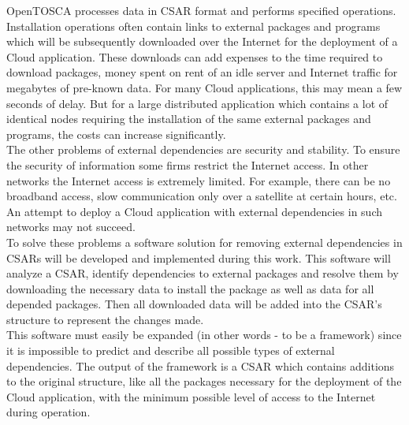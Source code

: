 OpenTOSCA processes data in CSAR format and performs specified operations. %
Installation operations often contain links to external packages and programs which will be subsequently downloaded over the Internet for the deployment of a Cloud application.
These downloads can add expenses to the time required to download packages, money spent on rent of an idle server and Internet traffic for megabytes of pre-known data.
For many Cloud applications, this may mean a few seconds of delay. 
But for a large distributed application which contains a lot of identical nodes requiring the installation of the same external packages and programs, the costs can increase significantly.\\
The other problems of external dependencies are security and stability.
To ensure the security of information some firms restrict the Internet access.
In other networks the Internet access is extremely limited.
For example, there can be no broadband access, slow communication only over a satellite at certain hours, etc.
An attempt to deploy a Cloud application with external dependencies in such networks may not succeed. \\
To solve these problems a software solution for removing external dependencies in CSARs will be developed and implemented during this work.
This software will analyze a CSAR, identify dependencies to external packages and resolve them by downloading the necessary data to install the package as well as data for all depended packages. 
Then all downloaded data will be added into the CSAR's structure to represent the changes made.
\\
This software must easily be expanded (in other words - to be a framework) since it is impossible to predict and describe all possible types of external dependencies.
The output of the framework is a CSAR which contains additions to the original structure, like all the packages necessary for the deployment of the Cloud application, with the minimum possible level of access to the Internet during operation.
\clearpage 
